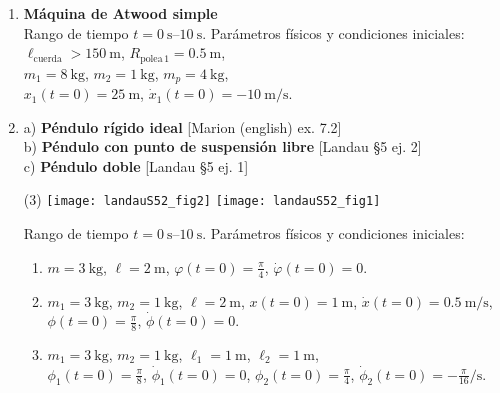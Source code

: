 \documentclass[11pt, spanish, a4paper, twoside]{article}
\begin{document}
\begin{enumerate}


\item 
\begin{minipage}[t][2.5cm]{0.7\textwidth}
\textbf{Máquina de Atwood simple}\\
Rango de tiempo \(t = \SIrange{0}{10}{\second}\).
Parámetros físicos y condiciones iniciales:\\
\(\ell_\mathrm{cuerda} > \SI{150}{\metre}\), 
\(R_{\mathrm{polea}\,1} = \SI{0.5}{\metre}\), \\ 
\(m_1 = \SI{8}{\kilo\gram}\), 
\(m_2 = \SI{1}{\kilo\gram}\), 
\(m_p = \SI{4}{\kilo\gram}\), \\
\(x_1(t=0) = \SI{25}{\metre}\), 
\(\dot{x}_1(t=0) = -\SI{10}{\metre\per\second}\).
\end{minipage}
\begin{minipage}[c][2cm][t]{0.3\textwidth}
	
\end{minipage}



\item
	a) \textbf{Péndulo rígido ideal} [Marion (english) ex. 7.2] \\
	b) \textbf{Péndulo con punto de suspensión libre} [Landau \S5 ej. 2]\\ 
	c) \textbf{Péndulo doble} [Landau \S5 ej. 1] 
\begin{tasks}(3)
	\task 
	\task \texttt{[image: landauS52\_fig2]}
	\task \texttt{[image: landauS52\_fig1]}
\end{tasks}
Rango de tiempo \(t = \SIrange{0}{10}{\second}\).
Parámetros físicos y condiciones iniciales: 
\begin{enumerate}
	\item \(m = \SI{3}{\kilo\gram}\), 
				\(\ell = \SI{2}{\metre}\), 
				\(\varphi (t=0) = \frac{\pi}{4}\), \(\dot{\varphi} (t=0) = 0\).
	\item \(m_1 = \SI{3}{\kilo\gram}\), \(m_2 = \SI{1}{\kilo\gram}\),   
				\(\ell = \SI{2}{\metre}\), 
				\(x(t=0) = \SI{1}{\metre}\), \(\dot{x} (t=0) = \SI{0.5}{\metre\per\second} \),
				\(\phi (t=0) = \frac{\pi}{8}\), \(\dot{\phi} (t=0) = 0\).
	\item \(m_1 = \SI{3}{\kilo\gram}\), \(m_2 = \SI{1}{\kilo\gram}\),
				\(\ell_1 = \SI{1}{\metre}\), \(\ell_2 = \SI{1}{\metre}\),\\ 
				\(\phi_1 (t=0) = \frac{\pi}{8}\), \(\dot{\phi}_1 (t=0) = 0\), 
				\(\phi_2 (t=0) = \frac{\pi}{4}\), \(\dot{\phi}_2 (t=0) = -\frac{\pi}{16} \si{\per\second}\).
\end{enumerate}



\end{enumerate}
\end{document}
